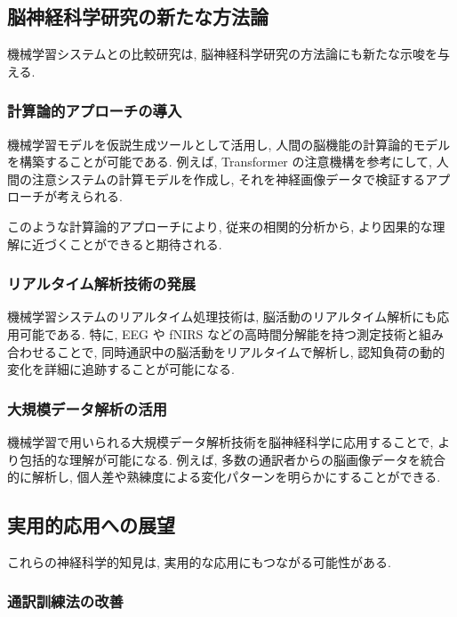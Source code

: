 \subsection{脳神経科学研究の新たな方法論}

機械学習システムとの比較研究は, 脳神経科学研究の方法論にも新たな示唆を与える.

\subsubsection{計算論的アプローチの導入}

機械学習モデルを仮説生成ツールとして活用し, 人間の脳機能の計算論的モデルを構築することが可能である.
例えば, Transformer の注意機構を参考にして, 人間の注意システムの計算モデルを作成し, それを神経画像データで検証するアプローチが考えられる.

このような計算論的アプローチにより, 従来の相関的分析から, より因果的な理解に近づくことができると期待される.

\subsubsection{リアルタイム解析技術の発展}

機械学習システムのリアルタイム処理技術は, 脳活動のリアルタイム解析にも応用可能である.
特に, EEG や fNIRS などの高時間分解能を持つ測定技術と組み合わせることで, 同時通訳中の脳活動をリアルタイムで解析し, 認知負荷の動的変化を詳細に追跡することが可能になる.

\subsubsection{大規模データ解析の活用}

機械学習で用いられる大規模データ解析技術を脳神経科学に応用することで, より包括的な理解が可能になる.
例えば, 多数の通訳者からの脳画像データを統合的に解析し, 個人差や熟練度による変化パターンを明らかにすることができる.

\subsection{実用的応用への展望}

これらの神経科学的知見は, 実用的な応用にもつながる可能性がある.

\subsubsection{通訳訓練法の改善}

